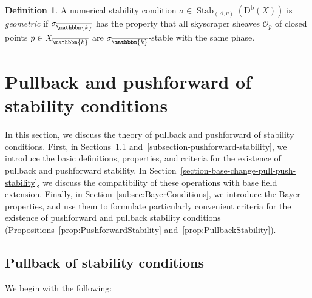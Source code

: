 \documentclass[11pt, reqno]{amsart}
\numberwithin{equation}{section}
\theoremstyle{plain}
\theoremstyle{remark}
\theoremstyle{definition}
\newtheorem{definition}[theorem]{Definition}
\theoremstyle{italicsname}
\newcommand{\Db}{\mathrm{D^b}}
\DeclareMathOperator{\Stab}{Stab}
\newcommand{\cO}{\mathcal{O}}
\newcommand{\KK}{\mathbbm{k}}
\begin{document}
\begin{definition}\label{def:GeometricSatbility}
A numerical stability condition $\sigma\in\Stab_{(\Lambda,v)}(\Db(X))$ is \emph{geometric} if $\sigma_{\overline{\KK}}$ has the property that all skyscraper sheaves $\cO_p$ of closed points $p\in X_{\overline{\KK}}$ are $\sigma_{\overline{\KK}}$-stable with the same phase. 
\end{definition}



\section{Pullback and pushforward of stability conditions}\label{sec:PullbackPushforward} 

In this section, we discuss the theory of pullback and pushforward of stability conditions. 
First, in Sections~\ref{subsection-pullback-stability} and~\ref{subsection-pushforward-stability}, we introduce the basic definitions, properties, and criteria for the existence of pullback and pushforward stability.  
In Section~\ref{section-base-change-pull-push-stability}, we discuss the compatibility of these operations with base field extension.
Finally, in Section~\ref{subsec:BayerConditions}, we introduce the Bayer properties, and use them to formulate particularly convenient criteria for the existence of pushforward and pullback stability conditions (Propositions~\ref{prop:PushforwardStability} and~\ref{prop:PullbackStability}). 

\subsection{Pullback of stability conditions} \label{subsection-pullback-stability}

We begin with the following:
\end{document}
